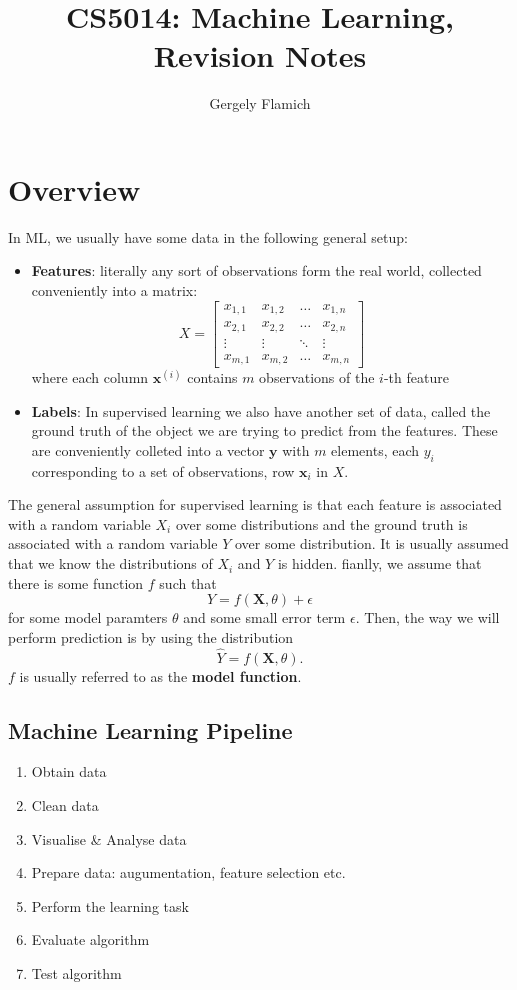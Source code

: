 \documentclass{article}
\title{CS5014: Machine Learning, Revision Notes}
\author{Gergely Flamich}
\renewcommand{\vec}[1]{\mathbf{#1}}
\begin{document}
\maketitle

\section{Overview}
In ML, we usually have some data in the following general setup:
\begin{itemize}
\item \textbf{Features}: literally any sort of observations form the real world,
  collected conveniently into a matrix:
  \[
    X =
    \begin{bmatrix}
      x_{1, 1} & x_{1, 2} & \hdots & x_{1, n} \\
      x_{2, 1} & x_{2, 2} & \hdots & x_{2, n} \\
      \vdots & \vdots & \ddots & \vdots \\
      x_{m, 1} & x_{m, 2} & \hdots & x_{m, n}
    \end{bmatrix}
  \]
  where each column $\vec{x}^{(i)}$ contains $m$ observations of the $i$-th feature
\item \textbf{Labels}: In supervised learning we also have another set of data,
  called the ground truth of the object we are trying to predict from the
  features. These are conveniently colleted into a vector $\vec{y}$ with $m$
  elements, each $y_i$ corresponding to a set of observations, row $\vec{x}_i$
  in $X$.
\end{itemize}
The general assumption for supervised learning is that each feature is associated with a random variable
$X_i$ over some distributions and the ground truth is associated with a random
variable $Y$ over some distribution. It is usually assumed that we know the
distributions of $X_i$ and $Y$ is hidden. fianlly, we assume that there is some
function $f$ such that
\[
  Y = f(\vec{X}, \theta) + \epsilon
\]
for some model paramters $\theta$ and some small error term $\epsilon$.
Then, the way we will perform prediction is by using the distribution
\[
  \hat{Y} = f(\vec{X}, \theta).
\]
$f$ is usually referred to as the \textbf{model function}.
\subsection{Machine Learning Pipeline}
\begin{enumerate}
\item Obtain data
\item Clean data
\item Visualise \& Analyse data
\item Prepare data: augumentation, feature selection etc.
\item Perform the learning task
\item Evaluate algorithm
\item Test algorithm
\end{enumerate}
\end{document}
